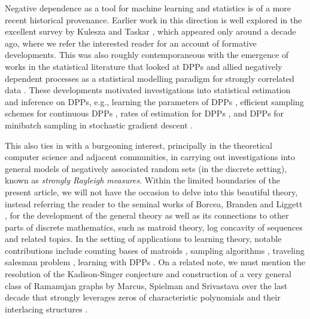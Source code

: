 Negative dependence as a tool for machine learning and statistics is of a more recent historical provenance. Earlier work in this direction is well explored  in the excellent survey by Kulesza and Taskar  \cite{kulesza_determinantal_2012}, which appeared only around a decade ago, where we refer the interested reader for an account of formative developments. This was also roughly contemporaneous with the emergence of works in the statistical literature that looked at DPPs and allied negatively dependent processes as a statistical modelling paradigm for strongly correlated data \cite{LaMoRu14, lavancier-1,lavancier-2}. These developments motivated investigations into statistical estimation and inference on DPPs, e.g., learning the parameters of DPPs \cite{Fox-Affandi-1, Rigollet-2},  efficient sampling schemes for continuous DPPs \cite{Fox-Affandi-2},  rates of estimation for DPPs \cite{Rigollet-1}, and DPPs for minibatch sampling in stochastic gradient descent \cite{OPE-NIPS}.  

This also ties in with a burgeoning interest, principally in the theoretical computer science and adjacent communities, in carrying out investigations into general models of negatively associated random sets (in the discrete setting), known as \emph{strongly Rayleigh measures}. 
Within the limited boundaries of the present article, we will not have the occasion to delve into this beautiful theory, instead referring the reader to the seminal works of Borcea, Branden and Liggett \cite{Borcea-Branden, Borcea-Branden-2, Borcea-Branden-3, Borcea-Branden-Liggett, BRANDEN, Branden-2}, for the development of the general theory as well as its connections to other parts of discrete mathematics, such as matroid theory, log concavity of sequences and related topics. In the setting of applications to learning theory, notable contributions include counting bases of matroids \cite{anari_logconcave2}, sampling algorithms \cite{anari_mcmc_rayleigh_dpp, Jegelka}, traveling salesman problem \cite{travelling-salesman}, learning with DPPs \cite{gartrell2020scalable,Sra,mariet_diversity_2017}. 
On a related note, we must mention the resolution of the Kadison-Singer conjecture and construction of a very general class of Ramanujan graphs by Marcus, Spielman and Srivastava over the last decade that strongly leverages zeros of characteristic polynomials and their interlacing structures \cite{interlacing-1, Marcus-Spielman-Srivastava, interlacing-3, interlacing-4}.


